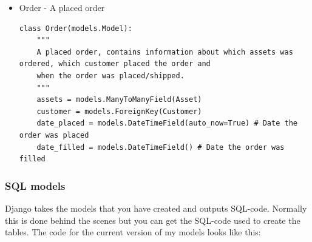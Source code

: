 \documentclass[12pt, a4paper,titlepage]{article}
\begin{document}
\begin{itemize}
\item Order - A placed order
\begin{lstlisting}
class Order(models.Model):
    """
    A placed order, contains information about which assets was ordered, which customer placed the order and
    when the order was placed/shipped.
    """
    assets = models.ManyToManyField(Asset)
    customer = models.ForeignKey(Customer)
    date_placed = models.DateTimeField(auto_now=True) # Date the order was placed
    date_filled = models.DateTimeField() # Date the order was filled 
\end{lstlisting}
\end{itemize}

\subsubsection{SQL models}
\label{sec:sqlmodels}
Django takes the models that you have created and outputs SQL-code.
Normally this is done behind the scenes but you can get the SQL-code used
to create the tables. The code for the current version of my models looks like
this:
\end{document}
